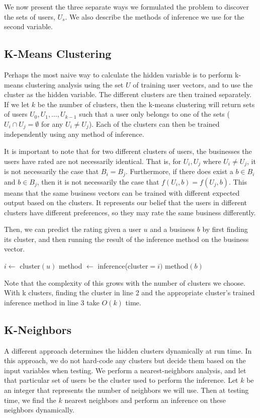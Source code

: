 \documentclass[11pt]{article}
\begin{document}
We now present the three separate ways we formulated the problem to discover the sets of users, $U_s$. We also describe the methods of inference we use for the second variable.

\subsection{K-Means Clustering}
Perhaps the most naive way to calculate the hidden variable is to perform k-means clustering analysis using the set $U$ of training user vectors, and to use the cluster as the hidden variable. The different clusters are then trained separately. If we let $k$ be the number of clusters, then the k-means clustering will return sets of users $U_0, U_1, \ldots, U_{k-1}$ such that a user only belongs to one of the sets ($U_i \cap U_j = \emptyset$ for any $U_i \neq U_j$). Each of the clusters can then be trained independently using any method of inference.

It is important to note that for two different clusters of users, the businesses the users have rated are not necessarily identical. That is, for $U_i, U_j$ where $U_i \neq U_j$, it is not necessarily the case that $B_i = B_j$. Furthermore, if there does exist a $b \in B_i$ and $b \in B_j$, then it is not necessarily the case that $f(U_i, b) = f(U_j, b)$. This means that the same business vectors can be trained with different expected output based on the clusters. It represents our belief that the users in different clusters have different preferences, so they may rate the same business differently. 

Then, we can predict the rating given a user $u$ and a business $b$ by first finding its cluster, and then running the result of the inference method on the business vector.\\

\begin{algorithmic}[1]
\State $i \gets$ cluster$(u)$ 
\State method $\gets$ inference(cluster$=i)$ 
\State \Return method$(b)$
\EndFunction
\end{algorithmic}
\medskip

Note that the complexity of this grows with the number of clusters we choose. With k clusters, finding the cluster in line 2 and the appropriate cluster's trained inference method in line 3 take $O(k)$ time.

\subsection{K-Neighbors}
A different approach determines the hidden clusters dynamically at run time. In this approach, we do not hard-code any clusters but decide them based on the input variables when testing. We perform a nearest-neighbors analysis, and let that particular set of users be the cluster used to perform the inference. Let $k$ be an integer that represents the number of neighbors we will use. Then at testing time, we find the $k$ nearest neighbors and perform an inference on these neighbors dynamically.\\
\end{document}
